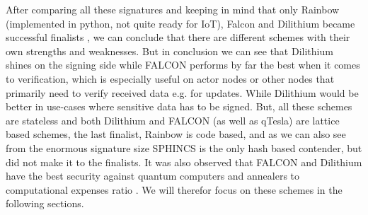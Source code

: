 \documentclass[conference]{IEEEtran}
\newcommand{\comment}[1]{}
\begin{document}
After comparing all these signatures and keeping in mind that only Rainbow (implemented in python, not quite ready for IoT), Falcon and Dilithium became successful finalists \cite{nist_finalists_website}, we can conclude that there are different schemes with their own strengths and weaknesses.
But in conclusion we can see that Dilithium shines on the signing side while FALCON performs by far the best when it comes to verification, which is especially useful on actor nodes or other nodes that primarily need to verify received data e.g. for updates.
While Dilithium would be better in use-cases where sensitive data has to be signed.
But, all these schemes are stateless and both Dilithium and FALCON (as well as qTesla) are lattice based schemes, the last finalist, Rainbow is code based, and as we can also see from the enormous signature size SPHINCS is the only hash based contender, but did not make it to the finalists.
It was also observed that FALCON and Dilithium have the best security against quantum computers and annealers to computational expenses ratio \cite{springer_security_analyses}. We will therefor focus on these schemes in the following sections.

\comment{ %
} %

\comment{ %
wahrscheinlich skippen da mir da hintergrund zu braid groups etc fehlt
} %

\comment{ %
not in the endgame but also not broken afaik
} %
\end{document}
